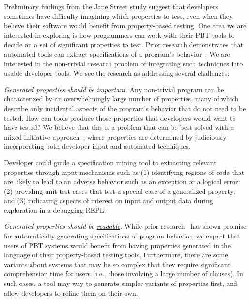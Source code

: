 

Preliminary findings from the Jane Street study suggest that developers sometimes have
difficulty imagining which properties to test, even when they believe their
software would benefit from property-based testing. One area we are interested
in exploring is how programmers can work with their PBT tools to decide on a set
of significant properties to test.  Prior research demonstrates that automated
tools can extract specifications of a program's
behavior~\cite{ref:ammons2002mining,ref:le2018deep,ref:claessen2010quickspec}. We are
interested in the non-trivial research problem of integrating such techniques
into usable developer tools. We see the research as addressing several
challenges:

\textit{Generated properties should be \underline{important}}. Any non-trivial
program can be characterized by an overwhelmingly large number of properties,
many of which describe only incidental aspects of the program's behavior that do
not need to be tested. How can tools produce those properties that developers
would want to have tested? We believe that this is a problem that can be best
solved with a mixed-initiative approach~\cite{ref:allen1999mixed}, where properties
are determined by judiciously incorporating both developer input and automated
techniques.

Developer could guide a specification mining tool to extracting relevant
properties through input mechanisms such as (1) identifying regions of code that
are likely to lead to an adverse behavior such as an exception or a logical
error; (2) providing unit test cases that test a special case of a generalized
property; and (3) indicating aspects of interest on input and output data during
exploration in a debugging REPL.

\textit{Generated properties should be
\underline{readable}}. While prior research~\cite{ref:claessen2010quickspec}
has shown promise for automatically generating specifications of program
behavior, we expect that users of PBT systems would benefit from having
properties generated in the language of their property-based testing tools.
Furthermore, there are some variants about systems that may be so complex that
they require significant comprehension time for users (i.e., those involving a
large number of clauses). In such cases, a tool may way to generate simpler
variants of properties first, and allow developers to refine them on their own.

